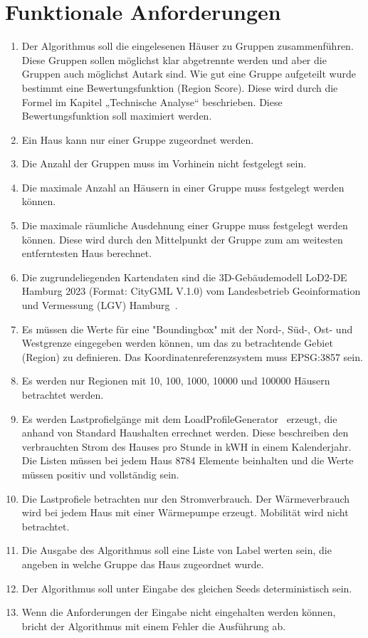 \section{Funktionale Anforderungen}
\begin{enumerate}[label=Req-\arabic*:]
    \item Der Algorithmus soll die eingelesenen Häuser zu Gruppen zusammenführen. Diese Gruppen sollen möglichst klar abgetrennte werden und  aber die Gruppen auch möglichst Autark sind. Wie gut eine Gruppe aufgeteilt wurde bestimmt eine Bewertungsfunktion (Region Score). Diese wird durch die Formel im Kapitel „Technische Analyse“ beschrieben. Diese Bewertungsfunktion soll maximiert werden.
    \item Ein Haus kann nur einer Gruppe zugeordnet werden.
    \item Die Anzahl der Gruppen muss im Vorhinein nicht festgelegt sein.
    \item Die maximale Anzahl an Häusern in einer Gruppe muss festgelegt werden können.
    \item Die maximale räumliche Ausdehnung einer Gruppe muss festgelegt werden können. Diese wird durch den Mittelpunkt der Gruppe zum am weitesten entferntesten Haus berechnet.
    \item Die zugrundeliegenden Kartendaten sind die 3D-Gebäudemodell LoD2-DE Hamburg 2023 (Format: CityGML V.1.0) vom Landesbetrieb Geoinformation und Vermessung (LGV) Hamburg~\cite{HH_LOD2}.
    \item Es müssen die Werte für eine "Boundingbox" mit der Nord-, Süd-, Ost- und Westgrenze eingegeben werden können, um das zu betrachtende Gebiet (Region) zu definieren. Das Koordinatenreferenzsystem muss EPSG:3857 sein.
    \item Es werden nur Regionen mit 10, 100, 1000, 10000 und 100000 Häusern betrachtet werden.
    \item Es werden Lastprofielgänge mit dem LoadProfileGenerator~\cite{LPG} erzeugt, die anhand von Standard Haushalten errechnet werden. Diese beschreiben den verbrauchten Strom des Hauses pro Stunde in kWH in einem Kalenderjahr. Die Listen müssen bei jedem Haus 8784 Elemente beinhalten und die Werte müssen positiv und vollständig sein.
    \item Die Lastprofiele betrachten nur den Stromverbrauch. Der Wärmeverbrauch wird bei jedem Haus mit einer Wärmepumpe erzeugt. Mobilität wird nicht betrachtet. 
    \item Die Ausgabe des Algorithmus soll eine Liste von Label werten sein, die angeben in welche Gruppe das Haus zugeordnet wurde. 
    \item Der Algorithmus soll unter Eingabe des gleichen Seeds deterministisch sein.
    \item Wenn die Anforderungen der Eingabe nicht eingehalten werden können, bricht der Algorithmus mit einem Fehler die Ausführung ab.
\end{enumerate}

